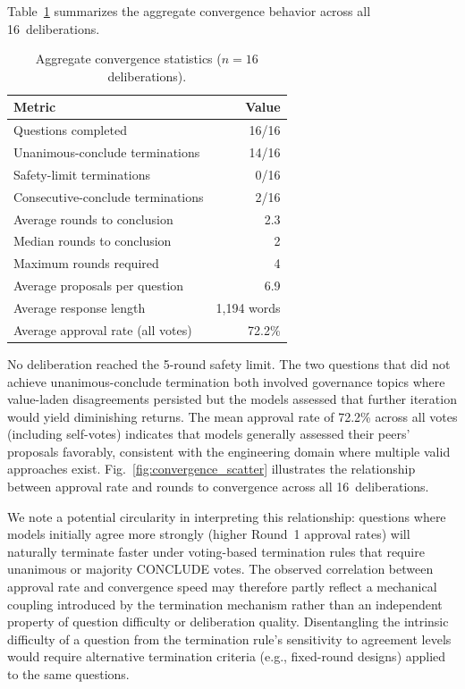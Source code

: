 \documentclass[11pt,a4paper]{article}
\begin{document}
Table~\ref{tab:convergence} summarizes the aggregate convergence behavior across all 16~deliberations.

\begin{table}[ht]
\centering
\caption{Aggregate convergence statistics ($n = 16$ deliberations).}
\label{tab:convergence}
\begin{tabular}{@{}lr@{}}
\toprule
\textbf{Metric} & \textbf{Value} \\
\midrule
Questions completed & 16/16 \\
Unanimous-conclude terminations & 14/16 \\
Safety-limit terminations & 0/16 \\
Consecutive-conclude terminations & 2/16 \\
Average rounds to conclusion & 2.3 \\
Median rounds to conclusion & 2 \\
Maximum rounds required & 4 \\
Average proposals per question & 6.9 \\
Average response length & 1{,}194 words \\
Average approval rate (all votes) & 72.2\% \\
\bottomrule
\end{tabular}
\end{table}

No deliberation reached the 5-round safety limit. The two questions that did not achieve unanimous-conclude termination both involved governance topics where value-laden disagreements persisted but the models assessed that further iteration would yield diminishing returns. The mean approval rate of 72.2\% across all votes (including self-votes) indicates that models generally assessed their peers' proposals favorably, consistent with the engineering domain where multiple valid approaches exist. Fig.~\ref{fig:convergence_scatter} illustrates the relationship between approval rate and rounds to convergence across all 16~deliberations.

We note a potential circularity in interpreting this relationship: questions where models initially agree more strongly (higher Round~1 approval rates) will naturally terminate faster under voting-based termination rules that require unanimous or majority CONCLUDE votes. The observed correlation between approval rate and convergence speed may therefore partly reflect a mechanical coupling introduced by the termination mechanism rather than an independent property of question difficulty or deliberation quality. Disentangling the intrinsic difficulty of a question from the termination rule's sensitivity to agreement levels would require alternative termination criteria (e.g., fixed-round designs) applied to the same questions.
\end{document}
